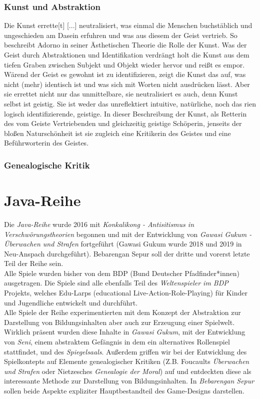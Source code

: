 \documentclass[12pt, a4paper, openany]{report}
\begin{document}
\subsection{Kunst und Abstraktion} \label{kunst-abstraktion}
Die Kunst \glqq errette[t] [...] neutralisiert, was einmal die Menschen buchstäblich und ungeschieden am Dasein erfuhren und was aus diesem der Geist vertrieb\grqq.
So beschreibt Adorno in seiner Ästhetischen Theorie die Rolle der Kunst. 
Was der Geist durch Abstraktionen und Identifikation verdrängt holt die Kunst aus dem tiefen Graben zwischen Subjekt und Objekt wieder hervor und reißt es empor. 
Wärend der Geist es gewohnt ist zu identifizieren, zeigt die Kunst das auf, was nicht (mehr) identisch ist und was sich mit Worten nicht ausdrücken lässt.
Aber sie errettet nicht nur das unmittelbare, sie neutralisiert es auch, denn Kunst selbst ist geistig.
Sie ist weder das unreflektiert intuitive, natürliche, noch das rien logisch identifizierende, geistige.
In dieser Beschreibung der Kunst, als Retterin des vom Geiste Vertriebenden und gleichzeitig geistige Schöperin, jenseits der bloßen Naturschönheit ist sie zugleich eine Kritikerin des Geistes und eine Beführworterin des Geistes. 

\subsection{Genealogische Kritik} \label{genealogische-kritik}

\chapter{Java-Reihe} \label{java-reihe}
Die \textit{Java-Reihe} wurde 2016 mit \textit{Konkalikong - Antisitismus in Verschwörungstheorien} begonnen und mit der Entwicklung von \textit{Gawasi Gukum - Überwachen und Strafen} fortgeführt (Gawasi Gukum wurde 2018 und 2019 in Neu-Anspach durchgeführt).
Bebarengan Sepur soll der dritte und vorerst letzte Teil der Reihe sein.\\ 
Alle Spiele wurden bisher von dem BDP (Bund Deutscher Pfadfinder*innen) ausgetragen. 
Die Spiele sind alle ebenfalls Teil des \textit{Weltenspieler im BDP} Projekts, welches Edu-Larps (educational Live-Action-Role-Playing) für Kinder und Jugendliche entwickelt und durchführt. \\
Alle Spiele der Reihe experimentierten mit dem Konzept der Abstraktion zur Darstellung von Bildungsinhalten aber auch zur Erzeugung einer Spielwelt. 
Wirklich präsent wurden diese Inhalte in \textit{Gawasi Gukum}, mit der Entwicklung von \textit{Seni}, einem abstraktem Gefängnis in dem ein alternatives Rollenspiel stattfindet, und des \textit{Spiegelsaals}.
Außerdem griffen wir bei der Entwicklung des Spielkontepts auf Elemente genealogischer Kritiken (Z.B. Foucaults \textit{Überwachen und Strafen} oder Nietzesches \textit{Genealogie der Moral}) auf und entdeckten diese als interessante Methode zur Darstellung von Bildungsinhalten.
In \textit{Bebarengan Sepur} sollen beide Aspekte expliziter Hauptbestandteil des Game-Designs darstellen. 

\printbibliography
\listoftodos
\end{document}
